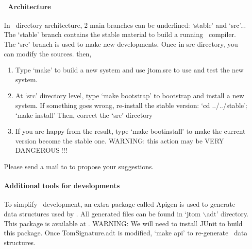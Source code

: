 \paragraph{\TOM\ Architecture}
In \TOM\ directory architecture, 2 main branches can be underlined:
`stable' and `src'...
The `stable' branch contains the stable material to build a running
\TOM\ compiler. The `src' branch is used to make new developments.
Once in src directory, you can modify the sources. then, 
\begin{enumerate}
\item Type `make' to build a new system and use jtom.src to use and
  test the new system.
\item At `src' directory level, type `make bootstrap' to bootstrap and
  install a new system.
  If something goes wrong, re-install the stable version:
  `cd ../../stable'; `make install'
  Then, correct the `src' directory
\item If you are happy from the result, type `make bootinstall' to
  make the current version become the stable one.   WARNING: this action may be VERY DANGEROUS !!!
\end{enumerate}
Please send a mail to  to propose your
suggestions.

\paragraph{Additional tools for developments}
To simplify \TOM\ development, an extra package called Apigen is used
to generate data structures used by \TOM. All generated files can be
found in `jtom $\backslash$adt' directory.
\\This package is available at
.
WARNING: We will need to install JUnit to build this package.
Once TomSignature.adt is modified, `make api' to re-generate \TOM\
data structures.
 

